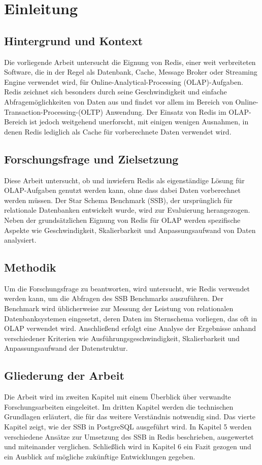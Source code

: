\chapter{Einleitung}


\section{Hintergrund und Kontext}
Die vorliegende Arbeit untersucht die Eignung von Redis, einer weit verbreiteten Software, die in der Regel als Datenbank, Cache, Message Broker oder Streaming Engine verwendet wird, für Online-Analytical-Processing (OLAP)-Aufgaben. Redis zeichnet sich besonders durch seine Geschwindigkeit und einfache Abfragemöglichkeiten von Daten aus und findet vor allem im Bereich von Online-Transaction-Processing-(OLTP) Anwendung. Der Einsatz von Redis im OLAP-Bereich ist jedoch weitgehend unerforscht, mit einigen wenigen Ausnahmen, in denen Redis lediglich als Cache für vorberechnete Daten verwendet wird.

\section{Forschungsfrage und Zielsetzung}
Diese Arbeit untersucht, ob und inwiefern Redis als eigenständige Lösung für OLAP-Aufgaben genutzt werden kann, ohne dass dabei Daten vorberechnet werden müssen. Der Star Schema Benchmark (SSB), der ursprünglich für relationale Datenbanken entwickelt wurde, wird zur Evaluierung herangezogen. Neben der grundsätzlichen Eignung von Redis für OLAP werden spezifische Aspekte wie Geschwindigkeit, Skalierbarkeit und Anpassungsaufwand von Daten analysiert.

\section{Methodik}
Um die Forschungsfrage zu beantworten, wird untersucht, wie Redis verwendet werden kann, um die Abfragen des SSB Benchmarks auszuführen. Der Benchmark wird üblicherweise zur Messung der Leistung von relationalen Datenbanksystemen eingesetzt, deren Daten im Sternschema vorliegen, das oft in OLAP verwendet wird.
Anschließend erfolgt eine Analyse der Ergebnisse anhand verschiedener Kriterien wie Ausführungsgeschwindigkeit, Skalierbarkeit und Anpassungsaufwand der Datenstruktur.


\section{Gliederung der Arbeit}
Die Arbeit wird im zweiten Kapitel mit einem Überblick über verwandte Forschungsarbeiten eingeleitet.
Im dritten Kapitel werden die technischen Grundlagen erläutert, die für das weitere Verständnis notwendig sind.
Das vierte Kapitel zeigt, wie der \acf{SSB} in PostgreSQL ausgeführt wird.
In Kapitel 5 werden verschiedene Ansätze zur Umsetzung des \ac{SSB} in Redis beschrieben, ausgewertet und miteinander verglichen.
Schließlich wird in Kapitel 6 ein Fazit gezogen und ein Ausblick auf mögliche zukünftige Entwicklungen gegeben.


